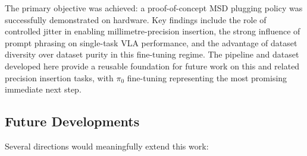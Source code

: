 \documentclass[conference]{IEEEtran}
\begin{document}
The primary objective was achieved: a proof-of-concept MSD plugging policy was successfully demonstrated on hardware. Key findings include the role of controlled jitter in enabling millimetre-precision insertion, the strong influence of prompt phrasing on single-task VLA performance, and the advantage of dataset diversity over dataset purity in this fine-tuning regime. The pipeline and dataset developed here provide a reusable foundation for future work on this and related precision insertion tasks, with $\pi_0$ fine-tuning representing the most promising immediate next step.

\subsection{Future Developments}

Several directions would meaningfully extend this work:
\end{document}
